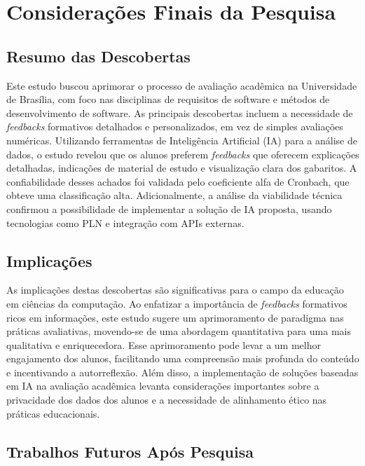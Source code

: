 \chapter{Considerações Finais da Pesquisa}

\section{Resumo das Descobertas}

Este estudo buscou aprimorar o processo de avaliação acadêmica na Universidade de Brasília, com foco nas disciplinas de requisitos de software e métodos de desenvolvimento de software. As principais descobertas incluem a necessidade de \textit{feedbacks} formativos detalhados e personalizados, em vez de simples avaliações numéricas. Utilizando ferramentas de Inteligência Artificial (IA) para a análise de dados, o estudo revelou que os alunos preferem \textit{feedbacks} que oferecem explicações detalhadas, indicações de material de estudo e visualização clara dos gabaritos. A confiabilidade desses achados foi validada pelo coeficiente alfa de Cronbach, que obteve uma classificação alta. Adicionalmente, a análise da viabilidade técnica confirmou a possibilidade de implementar a solução de IA proposta, usando tecnologias como PLN e integração com APIs externas.

\section{Implicações}

As implicações destas descobertas são significativas para o campo da educação em ciências da computação. Ao enfatizar a importância de \textit{feedbacks} formativos ricos em informações, este estudo sugere um aprimoramento de paradigma nas práticas avaliativas, movendo-se de uma abordagem quantitativa para uma mais qualitativa e enriquecedora. Esse aprimoramento pode levar a um melhor engajamento dos alunos, facilitando uma compreensão mais profunda do conteúdo e incentivando a autorreflexão. Além disso, a implementação de soluções baseadas em IA na avaliação acadêmica levanta considerações importantes sobre a privacidade dos dados dos alunos e a necessidade de alinhamento ético nas práticas educacionais.

\section{Trabalhos Futuros Após Pesquisa}

